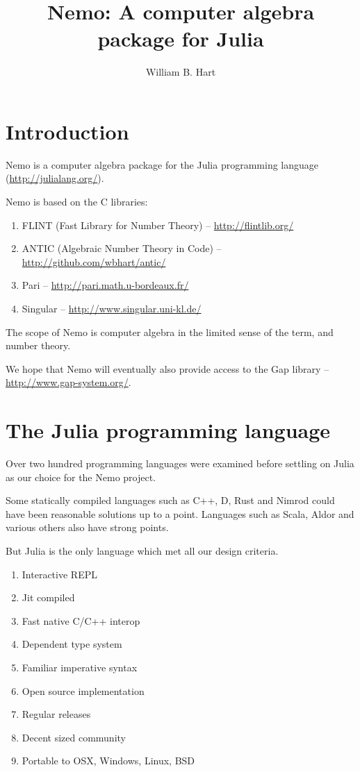 \documentclass[a4paper,10pt]{article}
\title{Nemo: A computer algebra package for Julia}
\author{William B. Hart}
\begin{document}
\maketitle
\tableofcontents

\section{Introduction}

Nemo is a computer algebra package for the Julia programming language (\url{http://julialang.org/}).

Nemo is based on the C libraries:

\begin{enumerate}
\item FLINT (Fast Library for Number Theory) -- \url{http://flintlib.org/}
\item ANTIC (Algebraic Number Theory in Code) -- \url{http://github.com/wbhart/antic/}
\item Pari -- \url{http://pari.math.u-bordeaux.fr/}
\item Singular -- \url{http://www.singular.uni-kl.de/}
\end{enumerate}

The scope of Nemo is computer algebra in the limited sense of the term, and number theory. 

We hope that Nemo will eventually also provide access to the Gap library -- 
\url{http://www.gap-system.org/}.

\section{The Julia programming language}

Over two hundred programming languages were examined before settling on Julia as our choice for the
Nemo project.

Some statically compiled languages such as C++, D, Rust and Nimrod could have been reasonable solutions
up to a point. Languages such as Scala, Aldor and various others also have strong points.

But Julia is the only language which met all our design criteria.

\begin{enumerate}
\item Interactive REPL
\item Jit compiled
\item Fast native C/C++ interop
\item Dependent type system
\item Familiar imperative syntax
\item Open source implementation
\item Regular releases
\item Decent sized community
\item Portable to OSX, Windows, Linux, BSD 
\end{enumerate}
\end{document}
